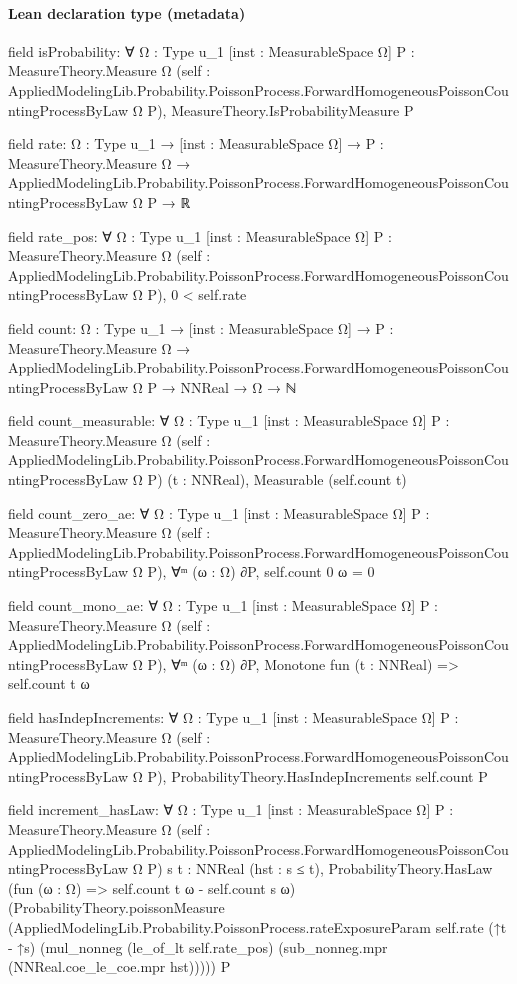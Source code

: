 \documentclass[10pt]{article}
\begin{document}
\paragraph{Lean declaration type (metadata)}
\begin{ReviewVerbatim}
field isProbability:
∀ {Ω : Type u_1} [inst : MeasurableSpace Ω] {P : MeasureTheory.Measure Ω}
  (self : AppliedModelingLib.Probability.PoissonProcess.ForwardHomogeneousPoissonCountingProcessByLaw Ω P),
  MeasureTheory.IsProbabilityMeasure P

field rate:
{Ω : Type u_1} →
  [inst : MeasurableSpace Ω] →
    {P : MeasureTheory.Measure Ω} →
      AppliedModelingLib.Probability.PoissonProcess.ForwardHomogeneousPoissonCountingProcessByLaw Ω P → ℝ

field rate_pos:
∀ {Ω : Type u_1} [inst : MeasurableSpace Ω] {P : MeasureTheory.Measure Ω}
  (self : AppliedModelingLib.Probability.PoissonProcess.ForwardHomogeneousPoissonCountingProcessByLaw Ω P),
  0 < self.rate

field count:
{Ω : Type u_1} →
  [inst : MeasurableSpace Ω] →
    {P : MeasureTheory.Measure Ω} →
      AppliedModelingLib.Probability.PoissonProcess.ForwardHomogeneousPoissonCountingProcessByLaw Ω P → NNReal → Ω → ℕ

field count_measurable:
∀ {Ω : Type u_1} [inst : MeasurableSpace Ω] {P : MeasureTheory.Measure Ω}
  (self : AppliedModelingLib.Probability.PoissonProcess.ForwardHomogeneousPoissonCountingProcessByLaw Ω P) (t : NNReal),
  Measurable (self.count t)

field count_zero_ae:
∀ {Ω : Type u_1} [inst : MeasurableSpace Ω] {P : MeasureTheory.Measure Ω}
  (self : AppliedModelingLib.Probability.PoissonProcess.ForwardHomogeneousPoissonCountingProcessByLaw Ω P),
  ∀ᵐ (ω : Ω) ∂P, self.count 0 ω = 0

field count_mono_ae:
∀ {Ω : Type u_1} [inst : MeasurableSpace Ω] {P : MeasureTheory.Measure Ω}
  (self : AppliedModelingLib.Probability.PoissonProcess.ForwardHomogeneousPoissonCountingProcessByLaw Ω P),
  ∀ᵐ (ω : Ω) ∂P, Monotone fun (t : NNReal) => self.count t ω

field hasIndepIncrements:
∀ {Ω : Type u_1} [inst : MeasurableSpace Ω] {P : MeasureTheory.Measure Ω}
  (self : AppliedModelingLib.Probability.PoissonProcess.ForwardHomogeneousPoissonCountingProcessByLaw Ω P),
  ProbabilityTheory.HasIndepIncrements self.count P

field increment_hasLaw:
∀ {Ω : Type u_1} [inst : MeasurableSpace Ω] {P : MeasureTheory.Measure Ω}
  (self : AppliedModelingLib.Probability.PoissonProcess.ForwardHomogeneousPoissonCountingProcessByLaw Ω P)
  {s t : NNReal} (hst : s ≤ t),
  ProbabilityTheory.HasLaw (fun (ω : Ω) => self.count t ω - self.count s ω)
    (ProbabilityTheory.poissonMeasure
      (AppliedModelingLib.Probability.PoissonProcess.rateExposureParam self.rate (↑t - ↑s)
        (mul_nonneg (le_of_lt self.rate_pos) (sub_nonneg.mpr (NNReal.coe_le_coe.mpr hst)))))
    P
\end{ReviewVerbatim}
\end{document}
